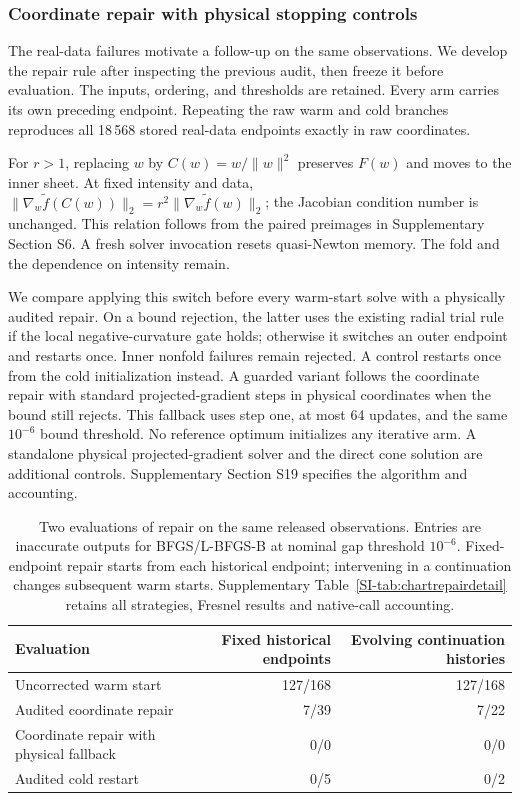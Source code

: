 \documentclass[10pt,a4paper]{article}
\begin{document}
\subsubsection{Coordinate repair with physical stopping controls}
\label{sec:chartrepair}
The real-data failures motivate a follow-up on the same observations. We develop the repair rule after inspecting the previous audit, then freeze it before evaluation. The inputs, ordering, and thresholds are retained. Every arm carries its own preceding endpoint. Repeating the raw warm and cold branches reproduces all 18\,568 stored real-data endpoints exactly in raw coordinates.

For $r>1$, replacing $w$ by $C(w)=w/\|w\|^2$ preserves $F(w)$ and moves to the inner sheet. At fixed intensity and data, $\|\nabla_w\widetilde f(C(w))\|_2=r^2\|\nabla_w\widetilde f(w)\|_2$; the Jacobian condition number is unchanged. This relation follows from the paired preimages in Supplementary Section S6. A fresh solver invocation resets quasi-Newton memory. The fold and the dependence on intensity remain.

We compare applying this switch before every warm-start solve with a physically audited repair. On a bound rejection, the latter uses the existing radial trial rule if the local negative-curvature gate holds; otherwise it switches an outer endpoint and restarts once. Inner nonfold failures remain rejected. A control restarts once from the cold initialization instead. A guarded variant follows the coordinate repair with standard projected-gradient steps in physical coordinates when the bound still rejects. This fallback uses step one, at most 64 updates, and the same $10^{-6}$ bound threshold. No reference optimum initializes any iterative arm. A standalone physical projected-gradient solver and the direct cone solution are additional controls. Supplementary Section S19 specifies the algorithm and accounting.

\begin{table}[!t]
\caption{Two evaluations of repair on the same released observations. Entries are inaccurate outputs for BFGS/L-BFGS-B at nominal gap threshold $10^{-6}$. Fixed-endpoint repair starts from each historical endpoint; intervening in a continuation changes subsequent warm starts. Supplementary Table~\ref{SI-tab:chartrepairdetail} retains all strategies, Fresnel results and native-call accounting.}
\label{tab:chartrepair}
\centering\small\renewcommand{\arraystretch}{1.12}
\begin{tabularx}{\textwidth}{@{}Xrr@{}}\toprule
Evaluation & Fixed historical endpoints & Evolving continuation histories\\\midrule
Uncorrected warm start & 127/168 & 127/168\\
Audited coordinate repair & 7/39 & 7/22\\
Coordinate repair with physical fallback & 0/0 & 0/0\\
Audited cold restart & 0/5 & 0/2\\\bottomrule
\end{tabularx}
\end{table}
\end{document}
